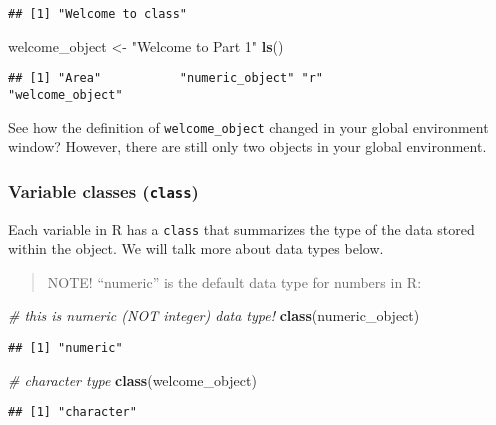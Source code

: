 \documentclass[]{article}
\newenvironment{Shaded}{\begin{snugshade}}{\end{snugshade}}
\newcommand{\KeywordTok}[1]{\textcolor[rgb]{0.13,0.29,0.53}{\textbf{#1}}}
\newcommand{\StringTok}[1]{\textcolor[rgb]{0.31,0.60,0.02}{#1}}
\newcommand{\CommentTok}[1]{\textcolor[rgb]{0.56,0.35,0.01}{\textit{#1}}}
\newcommand{\NormalTok}[1]{#1}
\begin{document}
\begin{verbatim}
## [1] "Welcome to class"
\end{verbatim}

\begin{Shaded}
\begin{Highlighting}[]
\NormalTok{welcome_object <-}\StringTok{ "Welcome to Part 1"}
\KeywordTok{ls}\NormalTok{() }
\end{Highlighting}
\end{Shaded}

\begin{verbatim}
## [1] "Area"           "numeric_object" "r"              "welcome_object"
\end{verbatim}

See how the definition of \texttt{welcome\_object} changed in your
global environment window? However, there are still only two objects in
your global environment.

\subsubsection{\texorpdfstring{Variable classes
(\texttt{class})}{Variable classes (class)}}\label{variable-classes-class}

Each variable in R has a \texttt{class} that summarizes the type of the
data stored within the object. We will talk more about data types below.

\begin{quote}
NOTE! ``numeric'' is the default data type for numbers in R:
\end{quote}

\begin{Shaded}
\begin{Highlighting}[]
\CommentTok{# this is numeric (NOT integer) data type!}
\KeywordTok{class}\NormalTok{(numeric_object) }
\end{Highlighting}
\end{Shaded}

\begin{verbatim}
## [1] "numeric"
\end{verbatim}

\begin{Shaded}
\begin{Highlighting}[]
\CommentTok{# character type}
\KeywordTok{class}\NormalTok{(welcome_object) }
\end{Highlighting}
\end{Shaded}

\begin{verbatim}
## [1] "character"
\end{verbatim}
\end{document}

